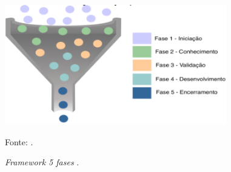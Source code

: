 \documentclass[
	12pt,				%
	openright,			%
	oneside,			%
	a4paper,			%
	english,			%
	french,				%
	spanish,			%
	brazil,				%
	]{abntex2}
\begin{document}
\begin{figure}[ht]
    \centering
    \caption{\textit{Framework 5 fases  }.}
    \includegraphics[width=3.8in]{Images/15Silva2021.png}
    \label{fig: silva21}
    
    \centering \small Fonte: \cite{silva2021}.
\end{figure}

\pagebreak
\end{document}
